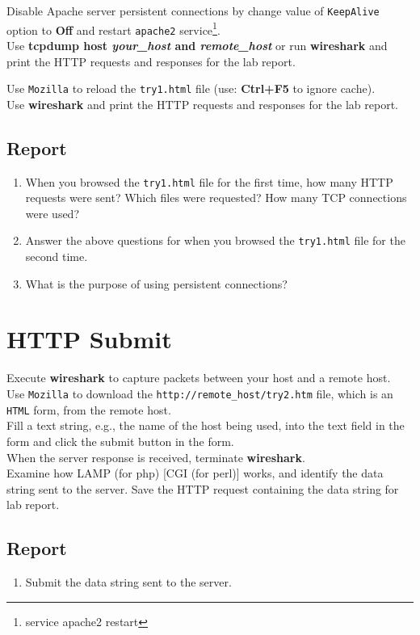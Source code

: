 \documentclass{../UTNetLab}
\begin{document}
    Disable Apache server persistent connections by change value of \texttt{KeepAlive} option to \textbf{Off} and restart \texttt{apache2} service\footnote{service apache2 restart}.\\
    
    Use \textbf{tcpdump host \textit{your\_host} and \textit{remote\_host}} or run \textbf{wireshark} and print the HTTP requests and responses for the lab report.
    
    Use \texttt{Mozilla} to reload the \texttt{try1.html} file (use: \textbf{Ctrl+F5} to ignore cache).\\
    Use \textbf{wireshark} and print the HTTP requests and responses for the lab report.

    \subsection*{Report}
    \begin{enumerate}
        \item When you browsed the \texttt{try1.html} file for the first time, how many HTTP requests were sent?
        Which files were requested?
        How many TCP connections were used?
        \item Answer the above questions for when you browsed the \texttt{try1.html} file for the second time.
        \item What is the purpose of using persistent connections?
    \end{enumerate}

\section{HTTP Submit}
    Execute \textbf{wireshark} to capture packets between your host and a remote host. \\
    Use \texttt{Mozilla} to download the \texttt{http://remote\_host/try2.htm} file, which is an \texttt{HTML} form, from the remote host. \\
    Fill a text string, e.g., the name of the host being used, into the text field in the form and click the submit button in the form. \\
    When the server response is received, terminate \textbf{wireshark}. \\
    Examine how LAMP (for php) [CGI (for perl)] works, and identify the data string sent to the server.
    Save the HTTP request containing the data string for lab report.

    \subsection*{Report}
    \begin{enumerate}
        \item Submit the data string sent to the server.
    \end{enumerate}
\end{document}
